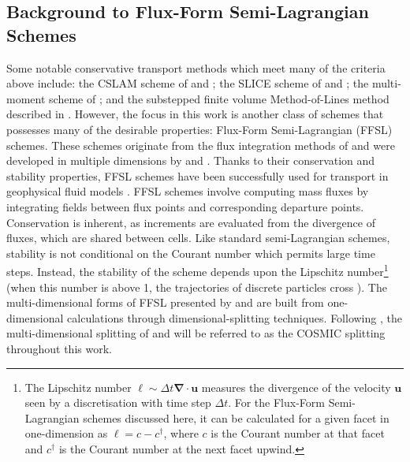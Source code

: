 \documentclass[11pt,a4paper]{article}
\begin{document}
\subsection{Background to Flux-Form Semi-Lagrangian Schemes}
Some notable conservative transport methods which meet many of the criteria above include: the CSLAM scheme of \citet{lauritzen2010conservative} and \citet{harris2011flux}; the SLICE scheme of \citet{zerroukat2002slice,zerroukat2004slice} and \citet{zerroukat2012three}; the multi-moment scheme of \cite{tang2022three}; and the substepped finite volume Method-of-Lines method described in \citet{melvin2024mixed}.
However, the focus in this work is another class of schemes that possesses many of the desirable properties: Flux-Form Semi-Lagrangian (FFSL) schemes.
These schemes originate from the flux integration methods of \citet{van1974towards,colella1984ppm,carpenter1990application}
and were developed in multiple dimensions by \citet{lin1996ffsl} and \citet{leonard1996cosmic}.
Thanks to their conservation and stability properties, FFSL schemes have been successfully used for transport in geophysical fluid models \citep{lin2004fvcore,putman2007fvtransport,zhou2012computational,neale2013mean,gillibrand2016mass,harris2021scientific,zhang2023history,mouallem2023implementation}.
FFSL schemes involve computing mass fluxes by integrating fields between flux points and corresponding departure points.
Conservation is inherent, as increments are evaluated from the divergence of fluxes, which are shared between cells.
Like standard semi-Lagrangian schemes, stability is not conditional on the Courant number which permits large time steps.
Instead, the stability of the scheme depends upon the Lipschitz number\footnote{The Lipschitz number $\ell \sim \Delta t\bm{\nabla\cdot u}$ measures the divergence of the velocity $\bm{u}$ seen by a discretisation with time step $\Delta t$. For the Flux-Form Semi-Lagrangian schemes discussed here, it can be calculated for a given facet in one-dimension as $\ell=c-c^\dagger$, where $c$ is the Courant number at that facet and $c^\dagger$ is the Courant number at the next facet upwind.} (when this number is above 1, the trajectories of discrete particles cross \citep{smolarkiewicz1992class}).
The multi-dimensional forms of FFSL presented by \citet{lin1996ffsl} and \citet{leonard1996cosmic} are built from one-dimensional calculations through dimensional-splitting techniques.
Following \citet{leonard1996cosmic}, the multi-dimensional splitting of \citet{lin1996ffsl} and \citet{leonard1996cosmic} will be referred to as the COSMIC splitting throughout this work.
\end{document}

